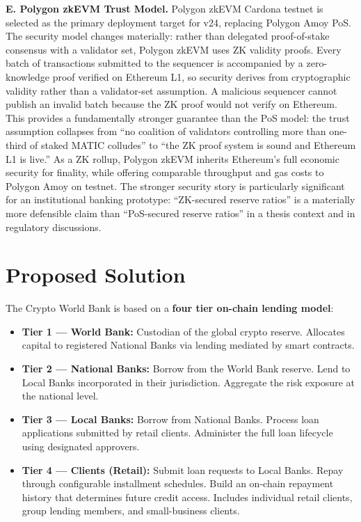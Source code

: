 \documentclass[12pt,a4paper]{report}
\begin{document}
\textbf{E. Polygon zkEVM Trust Model.}
Polygon zkEVM Cardona testnet is selected as the primary deployment target for v24, replacing Polygon Amoy PoS. The security model changes materially: rather than delegated proof-of-stake consensus with a validator set, Polygon zkEVM uses ZK validity proofs. Every batch of transactions submitted to the sequencer is accompanied by a zero-knowledge proof verified on Ethereum L1, so security derives from cryptographic validity rather than a validator-set assumption. A malicious sequencer cannot publish an invalid batch because the ZK proof would not verify on Ethereum. This provides a fundamentally stronger guarantee than the PoS model: the trust assumption collapses from ``no coalition of validators controlling more than one-third of staked MATIC colludes'' to ``the ZK proof system is sound and Ethereum L1 is live.'' As a ZK rollup, Polygon zkEVM inherits Ethereum's full economic security for finality, while offering comparable throughput and gas costs to Polygon Amoy on testnet. The stronger security story is particularly significant for an institutional banking prototype: ``ZK-secured reserve ratios'' is a materially more defensible claim than ``PoS-secured reserve ratios'' in a thesis context and in regulatory discussions.

\section{Proposed Solution}
\label{sec:proposed-solution}

The Crypto World Bank is based on a \textbf{four tier on-chain lending model}:

\begin{itemize}[noitemsep]
\item \textbf{Tier 1 --- World Bank:} Custodian of the global crypto reserve. Allocates capital to registered National Banks via lending mediated by smart contracts.
\item \textbf{Tier 2 --- National Banks:} Borrow from the World Bank reserve. Lend to Local Banks incorporated in their jurisdiction. Aggregate the risk exposure at the national level.
\item \textbf{Tier 3 --- Local Banks:} Borrow from National Banks. Process loan applications submitted by retail clients. Administer the full loan lifecycle using designated approvers.
\item \textbf{Tier 4 --- Clients (Retail):} Submit loan requests to Local Banks. Repay through configurable installment schedules. Build an on-chain repayment history that determines future credit access. Includes individual retail clients, group lending members, and small-business clients.
\end{itemize}
\end{document}
